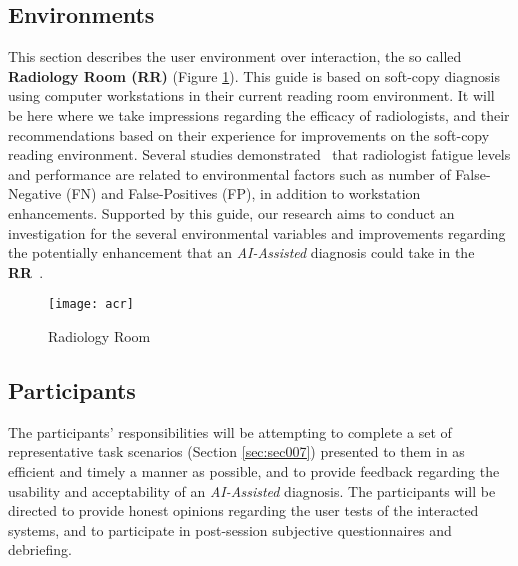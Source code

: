 \subsection{Environments}

This section describes the user environment over interaction, the so called \textbf{Radiology Room (RR)} (Figure \ref{fig:radioroom}). This guide is based on soft-copy diagnosis using computer workstations in their current reading room environment. It will be here where we take impressions regarding the efficacy of radiologists, and their recommendations based on their experience for improvements on the soft-copy reading environment. Several studies demonstrated~\cite{waite2017tired} that radiologist fatigue levels and performance are related to environmental factors such as number of False-Negative (FN) and False-Positives (FP), in addition to workstation enhancements. Supported by this guide, our research aims to conduct an investigation for the several environmental variables and improvements regarding the potentially enhancement that an \textit{AI-Assisted} diagnosis could take in the \textbf{RR}~\cite{ehrlich2016patient, miglioretti2007radiologist}.


\begin{figure}[h]
\centering
\texttt{[image: acr]}
\caption{Radiology Room}
\label{fig:radioroom}
\end{figure}



\subsection{Participants}

The participants' responsibilities will be attempting to complete a set of representative task scenarios (Section \ref{sec:sec007}) presented to them in as efficient and timely a manner as possible, and to provide feedback regarding the usability and acceptability of an \textit{AI-Assisted} diagnosis. The participants will be directed to provide honest opinions regarding the user tests of the interacted systems, and to participate in post-session subjective questionnaires and debriefing.


